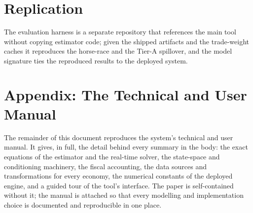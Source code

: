 \documentclass[11pt]{article}
\begin{document}
\section{Replication}
\label{app:replication}
The evaluation harness is a separate repository that references the main tool without copying estimator
code; given the shipped artifacts and the trade-weight caches it reproduces the horse-race and the
Tier-A spillover, and the model signature ties the reproduced results to the deployed system.




\clearpage
{}
{}
\section*{Appendix: The Technical and User Manual}
\label{app:manual}
The remainder of this document reproduces the system's technical and user manual. It gives, in full, the
detail behind every summary in the body: the exact equations of the estimator and the real-time solver,
the state-space and conditioning machinery, the fiscal accounting, the data sources and transformations
for every economy, the numerical constants of the deployed engine, and a guided tour of the tool's
interface. The paper is self-contained without it; the manual is attached so that every modelling and
implementation choice is documented and reproducible in one place.


\end{document}
